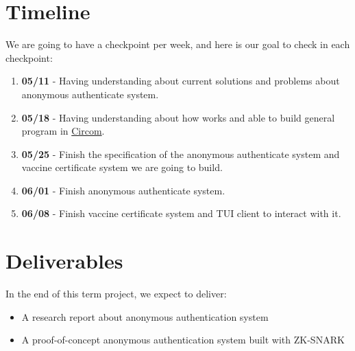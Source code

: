\documentclass[sigconf]{acmart}
\begin{document}
\section{Timeline}
We are going to have a checkpoint per week, and here is our goal to check in
each checkpoint:
\begin{enumerate}
    \item \textbf{05/11} - Having understanding about current solutions and
    problems about anonymous authenticate system.
    \item \textbf{05/18} - Having understanding about how \cite{Gro16} works and
    able to build general program in
    \href{https://github.com/iden3/circom}{Circom}.
    \item \textbf{05/25} - Finish the specification of the anonymous
    authenticate system and vaccine certificate system we are going to build.
    \item \textbf{06/01} - Finish anonymous authenticate system.
    \item \textbf{06/08} - Finish vaccine certificate system and TUI client to
    interact with it.
\end{enumerate}

\section{Deliverables}
In the end of this term project, we expect to deliver:
\begin{itemize}
    \item A research report about anonymous authentication system
    \item A proof-of-concept anonymous authentication system built with ZK-SNARK
\end{itemize}



\end{document}
